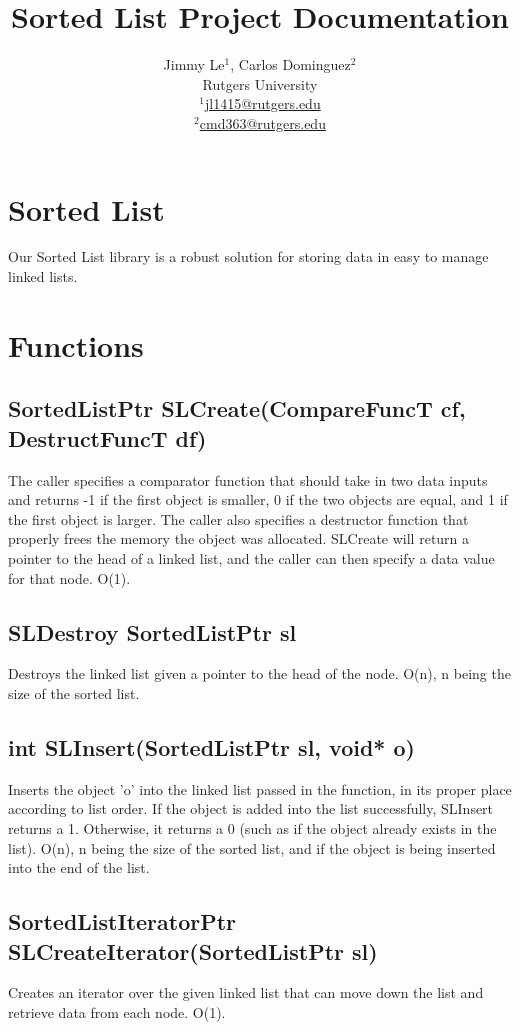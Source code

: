 \documentclass{article}
\title{Sorted List Project Documentation\\}
\date{}
\author{Jimmy Le$^{1}$, Carlos Dominguez$^{2}$\\
	Rutgers University\\
	\underline{$^{1}$jl1415@rutgers.edu}\\
	\underline{$^{2}$cmd363@rutgers.edu}}
\makeatletter
\renewcommand{\maketitle}{\bgroup\setlength{\parindent}{0pt}
\begin{flushleft}
  \textbf{\@title}
  \@author
\end{flushleft}\egroup
}
\makeatother
\begin{document}
\maketitle

\section{Sorted List}
Our Sorted List library is a robust solution for storing data in easy to manage linked lists. 

\section{Functions}

\subsection*{SortedListPtr SLCreate(CompareFuncT cf, DestructFuncT df)}
The caller specifies a comparator function that should take in two data inputs and returns -1 if the first object is smaller, 0 if the two objects are equal, and 1 if the first object is larger. The caller also specifies a destructor function that properly frees the memory the object was allocated. SLCreate will return a pointer to the head of a linked list, and the caller can then specify a data value for that node. O(1).

\subsection*{SLDestroy SortedListPtr sl}
Destroys the linked list given a pointer to the head of the node. O(n), n being the size of the sorted list.

\subsection*{int SLInsert(SortedListPtr sl, void* o)}
Inserts the object 'o' into the linked list passed in the function, in its proper place according to list order. If the object is added into the list successfully, SLInsert returns a 1. Otherwise, it returns a 0 (such as if the object already exists in the list). O(n), n being the size of the sorted list, and if the object is being inserted into the end of the list.

\subsection*{SortedListIteratorPtr SLCreateIterator(SortedListPtr sl)} 
Creates an iterator over the given linked list that can move down the list and retrieve data from each node. O(1).
\end{document}
